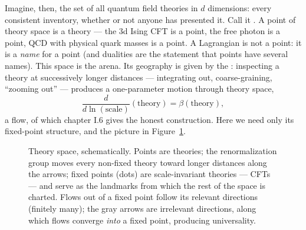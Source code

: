 Imagine, then, the set of all quantum field theories in $d$ dimensions: every
consistent inventory, whether or not anyone has presented it. Call it
. A point of theory space is a theory --- the 3d Ising CFT
is a point, the free photon is a point, QCD with physical quark masses is a
point. A Lagrangian is not a point: it is a \emph{name} for a point (and
dualities are the statement that points have several names). This space is the
arena. Its geography is given by the : inspecting a
theory at successively longer distances --- integrating out, coarse-graining,
``zooming out'' --- produces a one-parameter motion through theory space,
\begin{equation}
\frac{d}{d\ln(\text{scale})}(\text{theory}) = \beta(\text{theory}),
\end{equation}
a flow, of which chapter I.6 gives the honest construction. Here we need only
its fixed-point structure, and the picture in Figure~\ref{fig:theory-space}.

\begin{figure}[t]
\centering
{}
\caption{Theory space, schematically. Points are theories; the renormalization
  group moves every non-fixed theory toward longer distances along the arrows;
  fixed points (dots) are scale-invariant theories --- CFTs --- and serve as the
  landmarks from which the rest of the space is charted. Flows out of a fixed
  point follow its relevant directions (finitely many); the gray arrows are
  irrelevant directions, along which flows converge \emph{into} a fixed point,
  producing universality.}
\label{fig:theory-space}
\end{figure}


